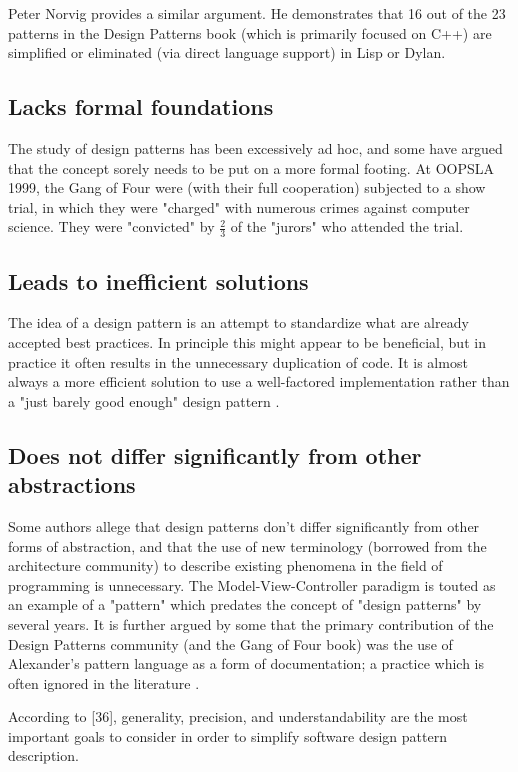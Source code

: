 \documentclass[sigplan,12pt,nonacm=true,review=false]{acmart}
\begin{document}
Peter Norvig provides a similar argument. He demonstrates that 16 out of the 23 patterns in the Design Patterns book (which is primarily focused on C++) are simplified or eliminated (via direct language support) in Lisp or Dylan.

\subsection{Lacks formal foundations}
The study of design patterns has been excessively ad hoc, and some have argued that the concept sorely needs to be put on a more formal footing. At OOPSLA 1999, the Gang of Four were (with their full cooperation) subjected to a show trial, in which they were "charged" with numerous crimes against computer science. They were "convicted" by $\frac{2}{3}$ of the "jurors" who attended the trial.

\subsection{Leads to inefficient solutions}
The idea of a design pattern is an attempt to standardize what are already accepted best practices. In principle this might appear to be beneficial, but in practice it often results in the unnecessary duplication of code. It is almost always a more efficient solution to use a well-factored implementation rather than a "just barely good enough" design pattern \cite{noauthor_design_nodate}.

\subsection{Does not differ significantly from other abstractions}
Some authors allege that design patterns don't differ significantly from other forms of abstraction, and that the use of new terminology (borrowed from the architecture community) to describe existing phenomena in the field of programming is unnecessary. The Model-View-Controller paradigm is touted as an example of a "pattern" which predates the concept of "design patterns" by several years. It is further argued by some that the primary contribution of the Design Patterns community (and the Gang of Four book) was the use of Alexander's pattern language as a form of documentation; a practice which is often ignored in the literature \cite{noauthor_design_nodate}.

According to [36], generality, precision, and understandability are the most important goals to consider in order to simplify software design pattern description.
\end{document}
